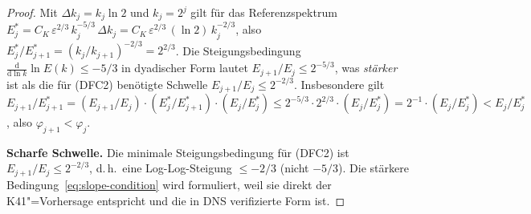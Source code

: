 \documentclass[12pt,a4paper]{article}
\theoremstyle{breakdef}
\theoremstyle{breakplain}
\theoremstyle{breakdef}
\begin{document}
\begin{proof}
Mit $\Delta k_j = k_j \ln 2$ und $k_j = 2^j$ gilt für das Referenzspektrum
$E_j^* = C_K\,\varepsilon^{2/3}\,k_j^{-5/3}\,\Delta k_j = C_K\,\varepsilon^{2/3}\,(\ln 2)\,k_j^{-2/3}$, also
$E_j^*/E_{j+1}^* = (k_j/k_{j+1})^{-2/3} = 2^{2/3}$. Die
Steigungsbedingung $\frac{\mathrm{d}}{\mathrm{d}\ln k}\ln E(k) \le -5/3$
in dyadischer Form lautet $E_{j+1}/E_j \le 2^{-5/3}$, was
\emph{stärker} ist als die für (DFC2) benötigte Schwelle
$E_{j+1}/E_j \le 2^{-2/3}$. Insbesondere gilt
$E_{j+1}/E_{j+1}^* = (E_{j+1}/E_j)\cdot(E_j^*/E_{j+1}^*)\cdot(E_j/E_j^*)
\le 2^{-5/3}\cdot 2^{2/3}\cdot(E_j/E_j^*) = 2^{-1}\cdot(E_j/E_j^*)
< E_j/E_j^*$, also $\varphi_{j+1} < \varphi_j$.

\smallskip\noindent
\textbf{Scharfe Schwelle.}\quad
Die minimale Steigungsbedingung für (DFC2) ist $E_{j+1}/E_j \le 2^{-2/3}$,
d.\,h.\ eine Log-Log-Steigung $\le -2/3$ (nicht $-5/3$). Die stärkere
Bedingung~\eqref{eq:slope-condition} wird formuliert, weil sie direkt
der K41"=Vorhersage entspricht und die in DNS verifizierte Form ist.
\end{proof}
\end{document}
